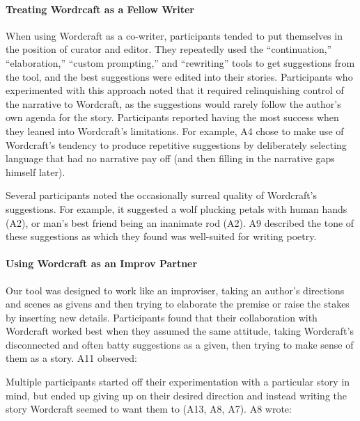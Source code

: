 \paragraph{Treating Wordrcaft as a Fellow Writer}
When using Wordcraft as a co-writer, participants tended to put themselves in the position of curator and editor. 
They repeatedly used the ``continuation,'' ``elaboration,'' ``custom prompting,'' and ``rewriting'' tools to get suggestions from the tool, and the best suggestions were edited into their stories. 
Participants who experimented with this approach noted that it required relinquishing control of the narrative to Wordcraft, as the suggestions would rarely follow the author's own agenda for the story.
Participants reported having the most success when they leaned into Wordcraft's limitations.
For example, A4 chose to make use of Wordcraft's tendency to produce repetitive suggestions by deliberately selecting language that had no narrative pay off (and then filling in the narrative gaps himself later).

Several participants noted the occasionally surreal quality of Wordcraft's suggestions. For example, it suggested a wolf plucking petals with human hands (A2), or man’s best friend being an inanimate rod (A2). A9 described the tone of these suggestions as  
which they found was well-suited for writing poetry. %

\paragraph{Using Wordcraft as an Improv Partner}
\label{section:improv}
Our tool was designed to work like an improviser, taking an author's directions and scenes as givens and then trying to elaborate the premise or raise the stakes by inserting new details.
Participants found that their collaboration with Wordcraft worked best when they assumed the same attitude, taking Wordcraft’s disconnected and often batty suggestions as a given, then trying to make sense of them as a story.
A11 observed: 

Multiple participants started off their experimentation with a particular story in mind, but ended up giving up on their desired direction and instead writing the story Wordcraft seemed to want them to (A13, A8, A7).
A8 wrote: 

